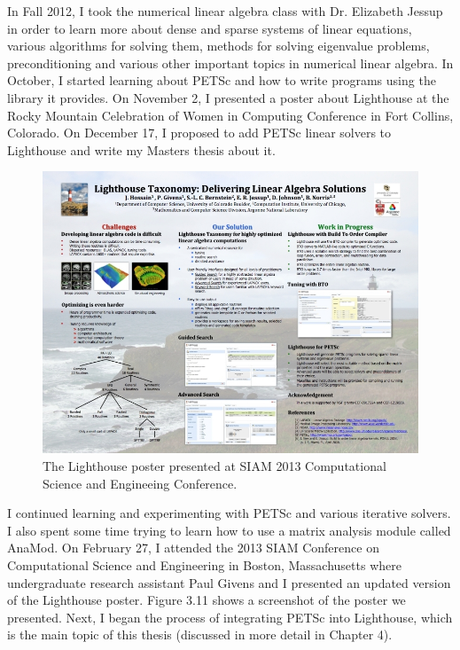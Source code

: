 \noindent  In Fall 2012, I took the numerical linear algebra class with Dr. Elizabeth Jessup in order to learn more about dense and sparse systems of linear equations, various algorithms for solving them, methods for solving eigenvalue problems, preconditioning and various other important topics in numerical linear algebra. In October, I started learning about PETSc and how to write programs using the library it provides. On November 2, I presented a poster about Lighthouse at the Rocky Mountain Celebration of Women in Computing Conference in Fort Collins, Colorado. On December 17, I proposed to add PETSc linear solvers to Lighthouse and write my Masters thesis about it.

\begin{figure}[h!]\label{lighthousePoster}
  \centering
  \includegraphics[width=6.5in]{figs/lighthousePoster}
  \caption[Lighthouse poster]
   {The Lighthouse poster presented at SIAM 2013 Computational Science and Engineeing Conference.}
\end{figure}


\noindent I continued learning and experimenting with PETSc and various iterative solvers. I also spent some time trying to learn how to use a matrix analysis module called AnaMod. On February 27, I attended the 2013 SIAM Conference on Computational Science and Engineering in Boston, Massachusetts where undergraduate research assistant Paul Givens and I presented an updated version of the Lighthouse poster. Figure 3.11 shows a screenshot of the poster we presented. Next, I began the process of integrating PETSc into Lighthouse, which is the main topic of this thesis (discussed in more detail in Chapter 4).